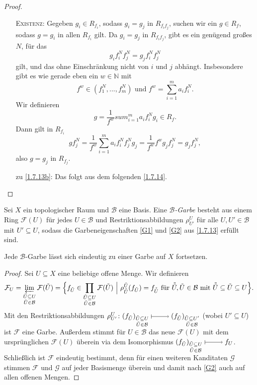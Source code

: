 \documentclass[a4paper,12pt]{scrbook}
\theoremstyle{keinenummern} %
\theoremstyle{mitnummern}
\theoremstyle{unserbeweis}
\newtheorem{proof}{Beweis}
\def\B{\mathcal{B}}
\newcommand{\F}{\mathcal{F}}
\def\G{\mathcal{G}}
\renewcommand{\dotsc}{\ensuremath{\!...}}
\newcommand{\set}[1]{\ensuremath{\mathbb{#1}}}
\newcommand{\N}{\set{N}}
\renewcommand{\mapsto}{\raisebox{-1pt}{\tikz{\draw[thin,shorten >=3pt, |->] (0,0) node{\hspace*{0pt}} -- node{} (1,0);}}\penalty1000\relax}
\begin{document}
\begin{proof}
\begin{enumerate}
    \textsc{Existenz}: Gegeben $g_i\in R_{f_i}$, sodass $g_i=g_j$ in $R_{f_if_j}$, suchen wir ein $g\in R_f$, sodass $g=g_i$ in
    allen $R_{f_i}$ gilt. Da $g_i=g_j$ in $R_{f_if_j}$, gibt es ein genügend großes $N$, für das \[g_if_i^Nf_j^N=g_jf_i^Nf_j^N\] gilt,
    und das ohne Einschränkung nicht von $i$ und $j$ abhängt. Insbesondere gibt es wie gerade eben ein $w\in\N$ mit
    \[f^w\in(f_1^N,\dotsc,f_m^N)\text{ und }f^w=\sum_{i=1}^ma_if_i^N.\] 
    Wir definieren 
    \[g=\frac{1}{f^w}sum_{i=1}^ma_if_i^Ng_i\in R_f.\] 
    Dann gilt in $R_{f_i}$
    \[ gf_j^N=\frac{1}{f^w}\sum_{i=1}^ma_if_i^Nf_j^Ng_j=\frac{1}{f^w}f^wg_jf_j^N=g_jf_j^N, \]
    also $g=g_j$ in $R_{f_j}$.
  \item [zu] \ref{1.7.13b}: Das folgt aus dem folgenden \cref{1.7.14}.
  \end{enumerate}
\end{proof}

\begin{lem}\label{1.7.14}
  Sei $X$ ein topologischer Raum und $\B$ eine Basis. Eine \emph{$\B$-Garbe} besteht aus einem Ring
  $\F(U)$ für jedes $U\in\B$ und Restriktionsabbildungen $\rho_{U'}^U$ für alle $U,U'\in\B$ mit
  $U'\subseteq U$, sodass die Garbeneigenschaften \ref{G1} und \ref{G2} aus \cref{1.7.13} erfüllt sind.

  Jede $\B$-Garbe lässt sich eindeutig zu einer Garbe auf $X$ fortsetzen.
\end{lem}
\begin{proof}
  Sei $U\subseteq X$ eine beliebige offene Menge. Wir definieren
  \[ \F_U = \varprojlim_{\substack{\tilde{U}\subseteq U\\\tilde{U}\in\B}}\F(\tilde{U}) =
     \Bigl\{f_{\tilde{U}}\in\prod_{\substack{\tilde{U}\subseteq U\\\tilde{U}\in\B}}\F(\tilde{U}) \ \Big|\ 
     \rho_{\tilde{\tilde{U}}}^{\tilde{U}}(f_{\tilde{U}})=f_{\tilde{\tilde{U}}}\text{ für }
     \tilde{\tilde{U}},\tilde{U}\in\B \text{ mit } \tilde{\tilde{U}}\subseteq\tilde{U}\subseteq U \Bigr\}. \]
     Mit den Restriktionsabbildungen
     $\rho_{U'}^U\colon (f_{\tilde{U}})_{\substack{\tilde{U}\subseteq U\\\tilde{U}\in\B}} \mapsto
     (f_{\tilde{U}})_{\substack{\tilde{U}\subseteq U'\\\tilde{U}\in\B}}$ (wobei $U'\subseteq U$) ist $\F$ eine
     Garbe. Außerdem stimmt für $U\in\B$ das neue $\F(U)$ mit dem ursprünglichen $\F(U)$ überein via
     dem Isomorphismus $(f_{\tilde{U}})_{\substack{\tilde{U}\subseteq U\\\tilde{U}\in\B}} \mapsto f_U$.
     Schließlich ist $\F$ eindeutig bestimmt, denn für einen weiteren Kanditaten $\G$ stimmen $\F$
     und $\G$ auf jeder Basismenge überein und damit nach \ref{G2} auch auf allen offenen Mengen.
\end{proof}
\end{document}

